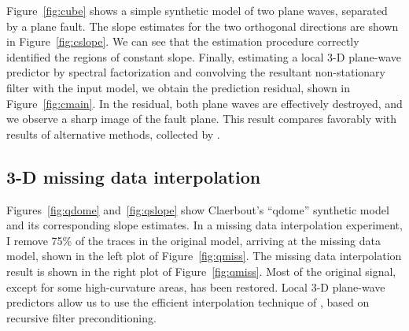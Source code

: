\par
Figure~\ref{fig:cube} shows a simple synthetic model of two plane
waves, separated by a plane fault. The slope estimates for the two
orthogonal directions are shown in Figure~\ref{fig:cslope}. We can see
that the estimation procedure correctly identified the regions of
constant slope. Finally, estimating a local 3-D plane-wave predictor by
spectral factorization and convolving the resultant non-stationary
filter with the input model, we obtain the prediction residual, shown
in Figure~\ref{fig:cmain}. In the residual, both plane waves are
effectively destroyed, and we observe a sharp image of the fault
plane. This result compares favorably with results of alternative
methods, collected by \cite{Schwab.sepphd.99}.
\subsection{3-D missing data interpolation}


Figures~\ref{fig:qdome} and~\ref{fig:qslope} show Claerbout's
``qdome'' synthetic model \cite{Claerbout.sep.77.19,gee} and its
corresponding slope estimates. In a missing data interpolation
experiment, I remove 75\% of the traces in the original model,
arriving at the missing data model, shown in the left plot of
Figure~\ref{fig:qmiss}. The missing data interpolation result is shown
in the right plot of Figure~\ref{fig:qmiss}. Most of the original
signal, except for some high-curvature areas, has been restored. Local
3-D plane-wave predictors allow us to use the efficient interpolation
technique of , based on recursive
filter preconditioning.


